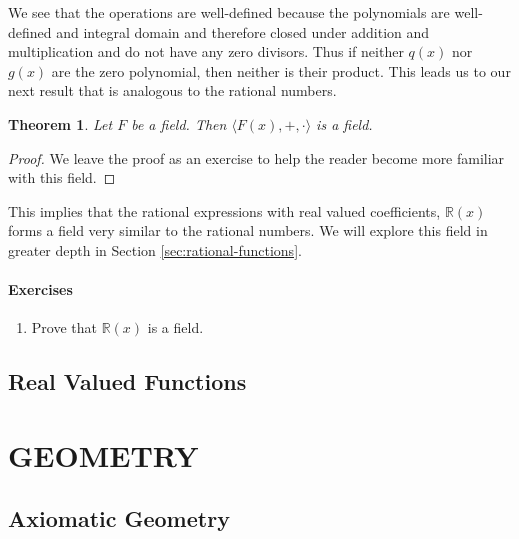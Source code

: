 \documentclass[
]{book}
\providecommand{\tightlist}{%
  \setlength{\itemsep}{0pt}\setlength{\parskip}{0pt}}
\newtheorem{theorem}{Theorem}[chapter]
\theoremstyle{definition}
\theoremstyle{definition}
\theoremstyle{definition}
\theoremstyle{remark}
\begin{document}
We see that the operations are well-defined because the polynomials are well-defined and integral domain and therefore closed under addition and multiplication and do not have any zero divisors. Thus if neither \(q(x)\) nor \(g(x)\) are the zero polynomial, then neither is their product. This leads us to our next result that is analogous to the rational numbers.

\begin{theorem}
\protect\hypertarget{thm:unnamed-chunk-207}{}{\label{thm:unnamed-chunk-207} }Let \(F\) be a field. Then \(\langle F(x),+,\cdot \rangle\) is a field.
\end{theorem}

\begin{proof}
{}We leave the proof as an exercise to help the reader become more familiar with this field.
\end{proof}

This implies that the rational expressions with real valued coefficients, \(\mathbb{R}(x)\) forms a field very similar to the rational numbers. We will explore this field in greater depth in Section \ref{sec:rational-functions}.

\hypertarget{exercises-26}{%
\subsection{Exercises}\label{exercises-26}}

\begin{enumerate}
\def\labelenumi{\arabic{enumi}.}
\tightlist
\item
  Prove that \(\mathbb{R}(x)\) is a field.
\end{enumerate}

\hypertarget{ch:real-valued-functions}{%
\chapter{Real Valued Functions}\label{ch:real-valued-functions}}

\hypertarget{part-geometry}{%
\part{GEOMETRY}\label{part-geometry}}

\hypertarget{ch:constructions}{%
\chapter{Axiomatic Geometry}\label{ch:constructions}}
\end{document}
